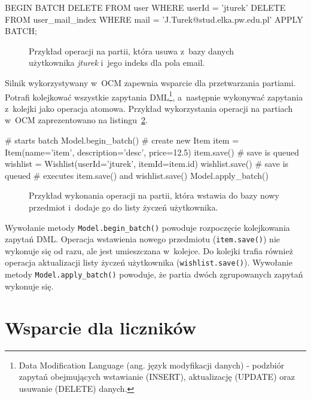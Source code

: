 \begin{verbbox}
	BEGIN BATCH
	  DELETE FROM user WHERE userId = 'jturek'
	  DELETE FROM user_mail_index WHERE mail = 'J.Turek@stud.elka.pw.edu.pl'
	APPLY BATCH;
\end{verbbox}

\begin{figure}[ht!]
	\centering
	\theverbbox
	\caption{Przykład operacji na partii, która usuwa z~bazy danych użytkownika \emph{jturek} i~jego indeks dla pola email.}
	\label{lst:batch_operation_cql_example}
\end{figure}

Silnik wykorzystywany w~OCM zapewnia wsparcie dla przetwarzania partiami. Potrafi kolejkować wszystkie zapytania DML\footnote{Data Modification Language (ang. język modyfikacji danych) - podzbiór zapytań obejmujących wstawianie (INSERT), aktualizację (UPDATE) oraz usuwanie (DELETE) danych.}, a~następnie wykonywać zapytania z~kolejki jako operacja atomowa. Przykład wykorzystania operacji na partiach w~OCM zaprezentowano na listingu~\ref{lst:ocm_batch_support}.

\begin{verbbox}
	# starts batch
	Model.begin_batch()
	# create new Item
	item = Item(name='item', description='desc', price=12.5)
	item.save()    # save is queued
	wishlist = Wishlist(userId='jturek', itemId=item.id)
	wishlist.save()    # save is queued
	# executes item.save() and wishlist.save()
	Model.apply_batch()
\end{verbbox}

\begin{figure}[ht!]
	\centering
	\theverbbox
	\caption{Przykład wykonania operacji na partii, która wstawia do bazy nowy przedmiot i~dodaje go do listy życzeń użytkownika.}
	\label{lst:ocm_batch_support}
\end{figure}

Wywołanie metody \verb+Model.begin_batch()+ powoduje rozpoczęcie kolejkowania zapytań DML. Operacja wstawienia nowego przedmiotu (\verb+item.save()+) nie wykonuje się od razu, ale jest umieszczana w~kolejce. Do kolejki trafia również operacja aktualizacji listy życzeń użytkownika (\verb+wishlist.save()+). Wywołanie metody \verb+Model.apply_batch()+ powoduje, że partia dwóch zgrupowanych zapytań wykonuje się.

\section{Wsparcie dla liczników}

